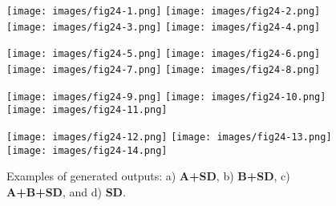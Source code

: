\documentclass[12pt, letterpaper]{article}
\begin{document}
\begin{figure}[h]
    \centering

    \begin{minipage}{\textwidth}
        \centering
        \texttt{[image: images/fig24-1.png]}
        \texttt{[image: images/fig24-2.png]}
        \texttt{[image: images/fig24-3.png]}
        \texttt{[image: images/fig24-4.png]}
        \label{fig24:row_a}
    \end{minipage}

    \begin{minipage}{\textwidth}
        \centering
        \texttt{[image: images/fig24-5.png]}
        \texttt{[image: images/fig24-6.png]}
        \texttt{[image: images/fig24-7.png]}
        \texttt{[image: images/fig24-8.png]}
        \label{fig24:row_b}
    \end{minipage}

    \begin{minipage}{\textwidth}
        \centering
        \texttt{[image: images/fig24-9.png]}
        \texttt{[image: images/fig24-10.png]}
        \texttt{[image: images/fig24-11.png]}
        \label{fig24:row_c}
    \end{minipage}

    \begin{minipage}{\textwidth}
        \centering
        \texttt{[image: images/fig24-12.png]}
        \texttt{[image: images/fig24-13.png]}
        \texttt{[image: images/fig24-14.png]}
        \label{fig24:row_d}
    \end{minipage}

    \caption{Examples of generated outputs: a) \textbf{A+SD}, b) \textbf{B+SD}, c) \textbf{A+B+SD}, and d) \textbf{SD}.}
    \label{fig24:all_images}
\end{figure}
\end{document}
